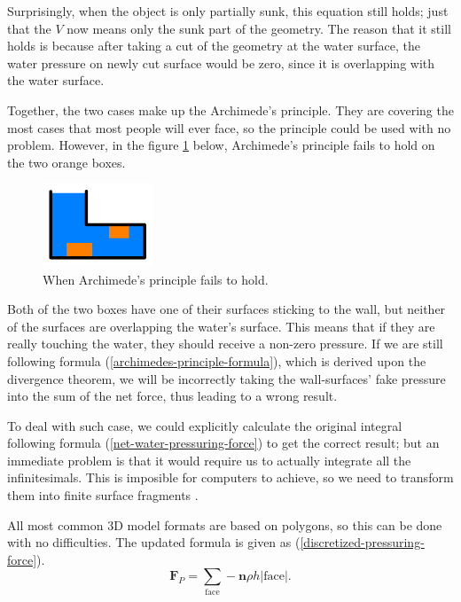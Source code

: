 Surprisingly, when the object is only partially sunk, this equation still holds;
just that the $V$ now means only the sunk part of the geometry.
The reason that it still holds is because after taking a cut of the geometry at the water surface, the water pressure on newly cut surface would be zero, since it is overlapping with the water surface.

Together, the two cases make up the Archimede's principle.
They are covering the most cases that most people will ever face, so the principle could be used with no problem.
However, in the figure \ref{archimedes-principle-failing-case} below, Archimede's principle fails to hold on the two orange boxes.

\begin{figure}[h]
	\begin{center}
		\includegraphics[width=1.3in]{figures/ap-blind-spot.png}
	\end{center}
	\caption{When Archimede's principle fails to hold.}
	\label{archimedes-principle-failing-case}
\end{figure}

Both of the two boxes have one of their surfaces sticking to the wall, but neither of the surfaces are overlapping the water's surface.
This means that if they are really touching the water, they should receive a non-zero pressure.
If we are still following formula (\ref{archimedes-principle-formula}), which is derived upon the divergence theorem, we will be incorrectly taking the wall-surfaces' fake pressure into the sum of the net force, thus leading to a wrong result.

To deal with such case, we could explicitly calculate the original integral following formula (\ref{net-water-pressuring-force}) to get the correct result; but an immediate problem is that it would require us to actually integrate all the infinitesimals.
This is imposible for computers to achieve, so we need to transform them into finite surface fragments \cite{klosek1997integration}.

All most common 3D model formats are based on polygons, so this can be done with no difficulties.
The updated formula is given as (\ref{discretized-pressuring-force}).
\begin{equation}
	\mathbf{F}_P=\sum_{\text{face}}-\mathbf{n}\rho h|\text{face}|.
	\label{discretized-pressuring-force}
\end{equation}

